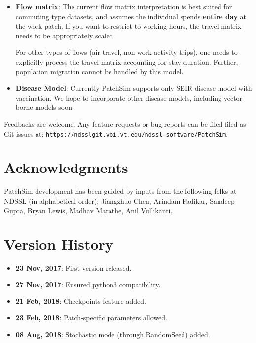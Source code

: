 \documentclass[10pt]{scrartcl}
\theoremstyle{definition}
\begin{document}
\begin{itemize}
	\item \textbf{Flow matrix}: The current flow matrix interpretation is best 
	suited for commuting type datasets, and assumes the individual spends 
	\textbf{entire day} at the work patch. If you want to restrict to working 
	hours, the travel matrix needs to be appropriately scaled.
	
	For other types of flows (air travel, non-work activity trips), one needs 
	to explicitly process the travel matrix accounting for stay duration. 
	Further, population migration cannot be handled by this model. 

	\item \textbf{Disease Model}: Currently PatchSim supports only SEIR disease 
	model with vaccination. We hope to incorporate other disease models, 
	including vector-borne models soon.
	
\end{itemize}

Feedbacks are welcome. Any feature requests or bug reports can be filed 
filed as Git issues at: 
\verb|https://ndsslgit.vbi.vt.edu/ndssl-software/PatchSim|.

\section{Acknowledgments}
PatchSim development has been guided by inputs from the following folks at 
NDSSL (in alphabetical order): Jiangzhuo Chen, Arindam Fadikar, Sandeep Gupta, 
Bryan Lewis, Madhav Marathe, Anil Vullikanti.

\section*{Version History}
\begin{itemize}
	\item \textbf{23 Nov, 2017}: First version released.
	\item \textbf{27 Nov, 2017}: Ensured python3 compatibility.
	\item \textbf{21 Feb, 2018}: Checkpoints feature added.
	\item \textbf{23 Feb, 2018}: Patch-specific parameters allowed. 
	\item \textbf{08 Aug, 2018}: Stochastic mode (through RandomSeed) added.
\end{itemize}
\end{document}
